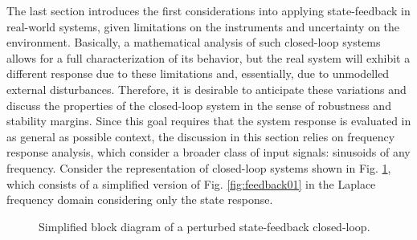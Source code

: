 \documentclass[a4paper,11pt]{book}
\numberwithin{figure}{chapter}
\numberwithin{equation}{chapter}
\numberwithin{table}{chapter}
\theoremstyle{definition}
\begin{document}
The last section introduces the first considerations into applying state-feedback in real-world systems, given limitations on the instruments and uncertainty on the environment. Basically, a mathematical analysis of such closed-loop systems allows for a full characterization of its behavior, but the real system will exhibit a different response due to these limitations and, essentially, due to unmodelled external disturbances. Therefore, it is desirable to anticipate these variations and discuss the properties of the closed-loop system in the sense of robustness and stability margins. Since this goal requires that the system response is evaluated in as general as possible context, the discussion in this section relies on frequency response analysis, which consider a broader class of input signals: sinusoids of any frequency. Consider the representation of closed-loop systems shown in Fig. \ref{fig:properties01}, which consists of a simplified version of Fig. \ref{fig:feedback01} in the Laplace frequency domain considering only the state response.

\begin{figure}[ht]
    \centering
    \caption{Simplified block diagram of a perturbed state-feedback closed-loop.}
    \label{fig:properties01}
\end{figure}
\end{document}
